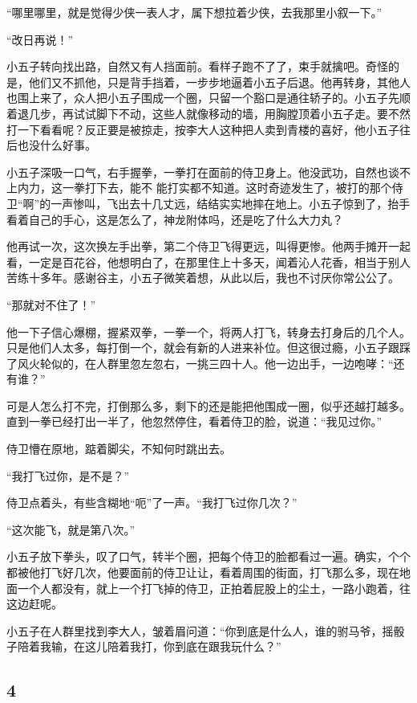 “哪里哪里，就是觉得少侠一表人才，属下想拉着少侠，去我那里小叙一下。”

“改日再说！”

小五子转向找出路，自然又有人挡面前。看样子跑不了了，束手就擒吧。奇怪的是，他们又不抓他，只是背手挡着，一步步地逼着小五子后退。他再转身，其他人也围上来了，众人把小五子围成一个圈，只留一个豁口是通往轿子的。小五子先顺着退几步，再试试脚下不动，这些人就像移动的墙，用胸膛顶着小五子走。要不然打一下看看呢？反正要是被掠走，按李大人这种把人卖到青楼的喜好，他小五子往后也没什么好事。

小五子深吸一口气，右手握拳，一拳打在面前的侍卫身上。他没武功，自然也谈不上内力，这一拳打下去，能不
能打实都不知道。这时奇迹发生了，被打的那个侍卫“啊”的一声惨叫，飞出去十几丈远，结结实实地摔在地上。小五子惊到了，抬手看着自己的手心，这是怎么了，神龙附体吗，还是吃了什么大力丸？

他再试一次，这次换左手出拳，第二个侍卫飞得更远，叫得更惨。他两手摊开一起看，一定是百花谷，他想明白了，在那里住上十多天，闻着沁人花香，相当于别人苦练十多年。感谢谷主，小五子微笑着想，从此以后，我也不讨厌你常公公了。

“那就对不住了！”

他一下子信心爆棚，握紧双拳，一拳一个，将两人打飞，转身去打身后的几个人。只是他们人太多，每打倒一个，就会有新的人进来补位。但这很过瘾，小五子跟踩了风火轮似的，在人群里忽左忽右，一挑三四十人。他一边出手，一边咆哮：“还有谁？”

可是人怎么打不完，打倒那么多，剩下的还是能把他围成一圈，似乎还越打越多。直到一拳已经打出一半了，他忽然停住，看着侍卫的脸，说道：“我见过你。”

侍卫懵在原地，踮着脚尖，不知何时跳出去。

“我打飞过你，是不是？”

侍卫点着头，有些含糊地“呃”了一声。“我打飞过你几次？”

“这次能飞，就是第八次。”

小五子放下拳头，叹了口气，转半个圈，把每个侍卫的脸都看过一遍。确实，个个都被他打飞好几次，他要面前的侍卫让让，看着周围的街面，打飞那么多，现在地面一个人都没有，就上一个打飞掉的侍卫，正拍着屁股上的尘土，一路小跑着，往这边赶呢。

小五子在人群里找到李大人，皱着眉问道：“你到底是什么人，谁的驸马爷，摇骰子陪着我输，在这儿陪着我打，你到底在跟我玩什么？”
\newline

{\centering\subsection{4}}

